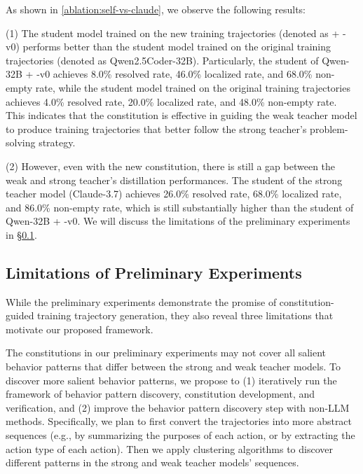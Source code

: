As shown in \autoref{ablation:self-vs-claude}, we observe the following results:

\noindent(1) The student model trained on the new training trajectories (denoted as + \plusname-v0) performs better than the student model trained on the original training trajectories (denoted as Qwen2.5Coder-32B).
Particularly, the student of Qwen-32B + \plusname-v0 achieves 8.0\% resolved rate, 46.0\% localized rate, and 68.0\% non-empty rate, while the student model trained on the original training trajectories achieves 4.0\% resolved rate, 20.0\% localized rate, and 48.0\% non-empty rate.
This indicates that the constitution is effective in guiding the weak teacher model to produce training trajectories that better follow the strong teacher's problem-solving strategy.

\noindent(2) However, even with the new constitution, there is still a gap between the weak and strong teacher's distillation performances.
The student of the strong teacher model (Claude-3.7) achieves 26.0\% resolved rate, 68.0\% localized rate, and 86.0\% non-empty rate, which is still substantially higher than the student of Qwen-32B + \plusname-v0.
We will discuss the limitations of the preliminary experiments in \S\ref{plus:sec:limpreliminary}.




\subsection{Limitations of Preliminary Experiments}
\label{plus:sec:limpreliminary}
While the preliminary experiments demonstrate the promise of constitution-guided training trajectory generation, they also reveal three limitations that motivate our proposed framework.

The constitutions in our preliminary experiments may not cover all salient behavior patterns that differ between the strong and weak teacher models.
To discover more salient behavior patterns, we propose to (1) iteratively run the framework of behavior pattern discovery, constitution development, and verification, and (2) improve the behavior pattern discovery step with non-LLM methods. Specifically, we plan to first convert the trajectories into more abstract sequences (e.g., by summarizing the purposes of each action, or by extracting the action type of each action). Then we apply clustering algorithms to discover different patterns in the strong and weak teacher models' sequences.


